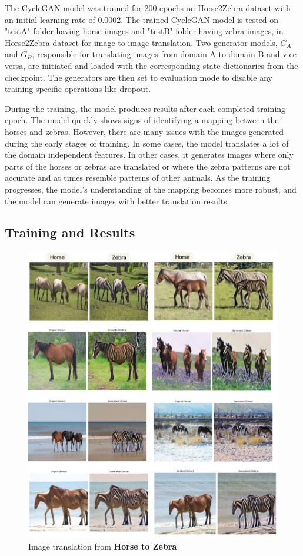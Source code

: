\documentclass[UKenglish,12pt]{master-style}
\begin{document}
The CycleGAN model was trained for 200 epochs on Horse2Zebra dataset with an initial learning rate of 0.0002.  The trained CycleGAN model is tested on "testA" folder having horse images and "testB" folder having zebra images, in Horse2Zebra dataset for image-to-image translation. Two generator models, $G_A$ and $G_B$, responsible for translating images from domain A to domain B and vice versa, are initiated and loaded with the corresponding state dictionaries from the checkpoint. The generators are then set to evaluation mode to disable any training-specific operations like dropout.

During the training, the model produces results after each completed training epoch. The model quickly shows signs of identifying a mapping between the horses and zebras. However, there are many issues with the images generated during the early stages of training. In some cases, the model translates a lot of the domain independent features. In other cases, it generates images where only parts of the horses or zebras are translated or where the zebra patterns are not accurate and at times resemble patterns of other animals. As the training progresses, the model's understanding of the mapping becomes more robust, and the model can generate images with better translation results. 

\subsection{Training and Results}

\begin{figure}[htbp]
    \centering
    \includegraphics[width=1\textwidth]{Images/Horse_To_Zebra.jpeg}
    \caption{Image translation from \textbf{Horse to Zebra}}
    \label{fig:Horse_To_Zebra}
\end{figure}
\end{document}
